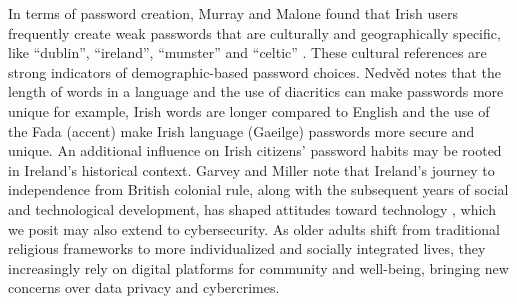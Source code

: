 
In terms of password creation, Murray and Malone found that Irish users frequently create weak passwords that are culturally and geographically specific, like ``dublin'', ``ireland'', ``munster'' and ``celtic'' \cite{murray2020convergence,murray2023adaptive}. These cultural references are strong indicators of demographic-based password choices.
Nedvěd \cite{nedvved2021careless} notes that the length of words in a language and the use of diacritics can make passwords more unique for example, Irish words are longer compared to English and the use of the Fada (accent) make Irish language (Gaeilge) passwords more secure and unique.
An additional influence on Irish citizens' password habits may be rooted in Ireland's historical context. Garvey and Miller note that Ireland's journey to independence from British colonial rule, along with the subsequent years of social and technological development, has shaped attitudes toward technology \cite{garvey2021ageing}, which we posit may also extend to cybersecurity. As older adults shift from traditional religious frameworks to more individualized and socially integrated lives, they increasingly rely on digital platforms for community and well-being, bringing new concerns over data privacy and cybercrimes.

